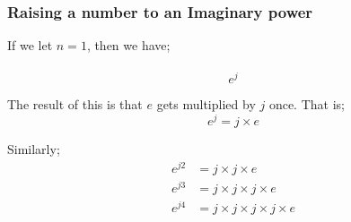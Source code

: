 \begin{frame}[t]

	\frametitle{Raising a number to an Imaginary power}

	If we let \(n = 1\), then we have;\\~
	\begin{equation} \label{eqn_slide_10_a}
	e^{j}
	\end{equation}

	The result of this is that \(e\) gets multiplied by \(j\) once. That is;
	\begin{equation} \label{eqn_slide_10_b}
	e^{j} = j \times e
	\end{equation}

	Similarly;
	\begin{align} \label{eqn_slide_10_c}
	e^{j2} &= j \times j \times e \\
	e^{j3} &= j \times j \times j \times e \\
	e^{j4} &= j \times j \times j \times j \times e
	\end{align}

\end{frame}

